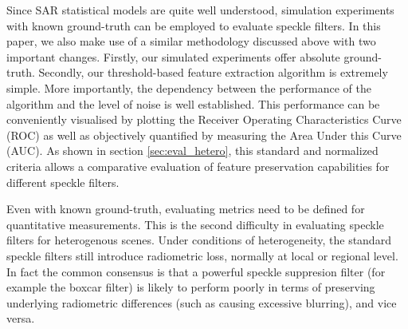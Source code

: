 \documentclass[journal]{IEEEtran}
\begin{document}
Since SAR statistical models are quite well understood, 
	simulation experiments with known ground-truth can be employed 
		to evaluate speckle filters.
In this paper, we also make use of a similar methodology discussed above with two important changes.
Firstly, our simulated experiments offer absolute ground-truth.
Secondly, our threshold-based feature extraction algorithm is extremely simple.
More importantly, the dependency between the performance of the algorithm and the level of noise is well established. 
This performance can be 
	conveniently visualised by plotting the Receiver Operating Characteristics Curve (ROC) 
	as well as objectively quantified by measuring the Area Under this Curve (AUC). 
As shown in section \ref{sec:eval_hetero}, this standard and normalized criteria allows a comparative evaluation of feature preservation capabilities for different speckle filters.

%

Even with known ground-truth, evaluating metrics need to be defined for quantitative measurements.
This is the second difficulty in evaluating speckle filters for heterogenous scenes.
Under conditions of heterogeneity, the standard speckle filters still introduce radiometric loss, normally at local or regional level.
In fact the common consensus is that a powerful speckle suppresion filter (for example the boxcar filter) is likely to perform poorly in terms of preserving underlying radiometric differences (such as causing excessive blurring), and vice versa. 
\end{document}
